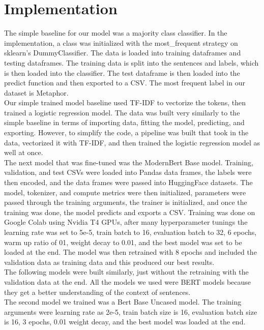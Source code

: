 \documentclass[11pt]{article}
\begin{document}
\section{Implementation}

The simple baseline for our model was a majority class classifier. In the 
implementation, a class was initialized with the most\_frequent 
strategy on sklearn's DummyClassifier. The data is loaded into 
training dataframes and testing dataframes. The training data is split into the 
sentences and labels, which is then loaded into the classifier. The test dataframe 
is then loaded into the predict function and then exported to a CSV. The most frequent
 label in our dataset is Metaphor. \\

Our simple trained model baseline used TF-IDF to vectorize the tokens, then
 trained a logistic regression model. The data was built very similarly to 
 the simple baseline in terms of importing data, fitting the model, predicting, 
 and exporting. However, to simplify the code, a pipeline was built that took in 
 the data, vectorized it with TF-IDF, and then trained the logistic regression model 
 as well at once. \\
	
  The next model that was fine-tuned was the ModernBert Base model. Training, 
  validation, and test CSVs were loaded into Pandas data frames, the labels were 
  then encoded, and the data frames were passed into HuggingFace datasets. The model, 
  tokenizer, and compute metrics were then initialized, parameters were passed through 
  the training arguments, the trainer is initialized, and once the training was done, 
  the model predicts and exports a CSV. Training was done on Google Colab using Nvidia 
  T4 GPUs, after many hyperparameter tunings the learning rate was set to 5e-5, 
  train batch to 16, evaluation batch to 32, 6 epochs, warm up ratio of 01, weight 
  decay to 0.01, and the best model was set to be loaded at the end. The model was 
  then retrained with 8 epochs and included the validation data as training data and
   this produced our best results. \\
	
  The following models were built similarly, just without the retraining with the 
  validation data at the end. All the models we used were BERT models because they 
  get a better understanding of the context of sentences. \\
	
  The second model we trained was a Bert Base Uncased model. The training arguments 
  were learning rate as 2e-5, train batch size is 16, evaluation batch size is 16, 3 
  epochs, 0.01 weight decay, and the best model was loaded at the end. \\
	
\end{document}
